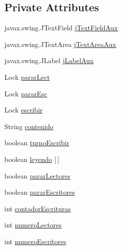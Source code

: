 \subsection*{Private Attributes}
\begin{DoxyCompactItemize}
\item 
javax.\+swing.\+J\+Text\+Field \mbox{\hyperlink{classpecl2ignacioribera_1_1_libro_a087e60795a9f9b8c9f393bfcb9a4d70b}{j\+Text\+Field\+Aux}}
\item 
javax.\+swing.\+J\+Text\+Area \mbox{\hyperlink{classpecl2ignacioribera_1_1_libro_aa3e89b7cad094609fe96bb5ec370c5a6}{j\+Text\+Area\+Aux}}
\item 
javax.\+swing.\+J\+Label \mbox{\hyperlink{classpecl2ignacioribera_1_1_libro_a4dfd577c8a08d50696cc33d536d5f2fa}{j\+Label\+Aux}}
\item 
Lock \mbox{\hyperlink{classpecl2ignacioribera_1_1_libro_a22f5f2548738658bcdeaf0f8ee7fc11c}{parar\+Lect}}
\item 
Lock \mbox{\hyperlink{classpecl2ignacioribera_1_1_libro_a04507c6abbbfac23e0faf81ba95e774a}{parar\+Esc}}
\item 
Lock \mbox{\hyperlink{classpecl2ignacioribera_1_1_libro_a068f41dc0aac9a0755aacb19126110bf}{escribir}}
\item 
String \mbox{\hyperlink{classpecl2ignacioribera_1_1_libro_acb52ac741427b64544c1f65b6bbb898a}{contenido}}
\item 
boolean \mbox{\hyperlink{classpecl2ignacioribera_1_1_libro_a34d076d438d7b6309b4b499a94d52277}{turno\+Escribir}}
\item 
boolean \mbox{\hyperlink{classpecl2ignacioribera_1_1_libro_adc1f39f45ab2ae4174206c9ee53f2f97}{leyendo}} \mbox{[}$\,$\mbox{]}
\item 
boolean \mbox{\hyperlink{classpecl2ignacioribera_1_1_libro_a5d69f4d0825673ec1882cfdb390217a9}{parar\+Lectores}}
\item 
boolean \mbox{\hyperlink{classpecl2ignacioribera_1_1_libro_a8925b951b1b46dc4c3620730cd28480a}{parar\+Escritores}}
\item 
int \mbox{\hyperlink{classpecl2ignacioribera_1_1_libro_a85a779880390c56f68c584689668e3d0}{contador\+Escrituras}}
\item 
int \mbox{\hyperlink{classpecl2ignacioribera_1_1_libro_a8c1b217886e7be49de89d57c5ef47c7e}{numero\+Lectores}}
\item 
int \mbox{\hyperlink{classpecl2ignacioribera_1_1_libro_a1645482c1d2dbef4a6537b1a96986529}{numero\+Escritores}}
\end{DoxyCompactItemize}


